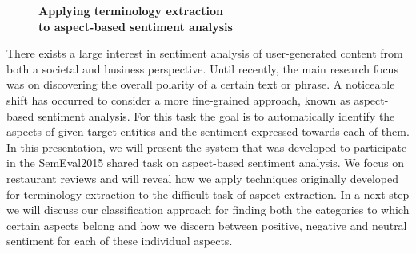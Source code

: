 \documentclass[10pt, a4paper, twopage, headinclude, footinclude, BCOR5mm]{book}
\begin{document}
\newpage

\begin{figure}[t!]
\centering
\large\textbf{Applying terminology extraction \\ to aspect-based sentiment analysis}
\vspace*{0.5cm}
\end{figure}


\begin{table}[t!]
\end{table} 
\noindent
There exists a large interest in sentiment analysis of user-generated content from both a societal and business perspective. Until recently, the main research focus was on discovering the overall polarity of a certain text or phrase. A noticeable shift has occurred to consider a more fine-grained approach, known as aspect-based sentiment analysis. For this task the goal is to automatically identify the aspects of given target entities and the sentiment expressed towards each of them. In this presentation, we will present the system that was developed to participate in the SemEval2015 shared task on aspect-based sentiment analysis. We focus on restaurant reviews and will reveal how we apply techniques originally developed for terminology extraction to the difficult task of aspect extraction. In a next step we will discuss our classification approach for finding both the categories to which certain aspects belong and how we discern between positive, negative and neutral sentiment for each of these individual aspects.  
\end{document}
